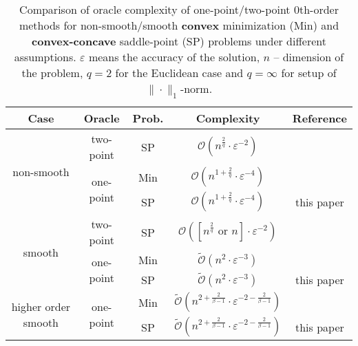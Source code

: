 \documentclass[runningheads]{llncs}
\begin{document}
\begin{table}[h!]
\begin{center}
\begin{tabular}{ccccc}
\textbf{Case}  &  \textbf{Oracle} & \textbf{Prob.} & \textbf{Complexity}  & \textbf{Reference}  \\ \hline
\multirow{3}{*}{non-smooth} & two-point & SP  & $\mathcal{O} \left( n^{\frac{2}{q}} \cdot \varepsilon^{-2}\right)$  & \cite{aleks2020gradientfree}\\ \cline{2-5} 
                  & \multirow{2}{*}{one-point} & Min  & $\mathcal{O} \left( n^{1 + \frac{2}{q}} \cdot\varepsilon^{-4}\right)$  & \cite{gasnikov2017stochastic}  \\ \cline{3-5} 
                  &          & SP & $\mathcal{O} \left( n^{1 + \frac{2}{q}} \cdot \varepsilon^{-4}\right)$  & this paper  \\ \hline
\multirow{3}{*}{smooth} & two-point            & SP  & $\mathcal{O} \left( [n^{\frac{2}{q}} \text{ or } n] \cdot \varepsilon^{-2}\right)$  & \cite{sadiev2020zeroth}  \\ \cline{2-5} 
                  & \multirow{2}{*}{ one-point} & Min& $\tilde{\mathcal{O}} \left(n^{2} \cdot \varepsilon^{-3} \right)$ & \cite{gasnikov2017stochastic} \\ \cline{3-5} 
                  &          & SP  & $\tilde{\mathcal{O}} \left(n^{2} \cdot \varepsilon^{-3} \right)$ & this paper \\ \hline
                  
\multirow{2}{*}{higher order smooth} 
                  & \multirow{2}{*}{ one-point} & Min  & $\tilde{\mathcal{O}} \left(n^{2+\frac{2}{\beta-1}} \cdot \varepsilon^{-2-\frac{2}{\beta-1}} \right)$ & \cite{novitskii2021improved,akhavan2020exploiting} \\ \cline{3-5} 
                  &          & SP  & $\tilde{\mathcal{O}} \left(n^{2+\frac{2}{\beta-1}} \cdot \varepsilon^{-2-\frac{2}{\beta-1}} \right)$ & this paper \\ \hline
\end{tabular}
\end{center}
\caption{Comparison of oracle complexity of one-point/two-point 0th-order methods for non-smooth/smooth \textbf{convex} minimization (Min) and \textbf{convex-concave} saddle-point (SP) problems under different assumptions. $\varepsilon$ means the accuracy of the solution, $n$ -- dimension of the problem, $q = 2$ for the Euclidean case and $q = \infty$ for setup of $\|\cdot\|_1$-norm.}
\label{summary_1}
\end{table}
\end{document}
